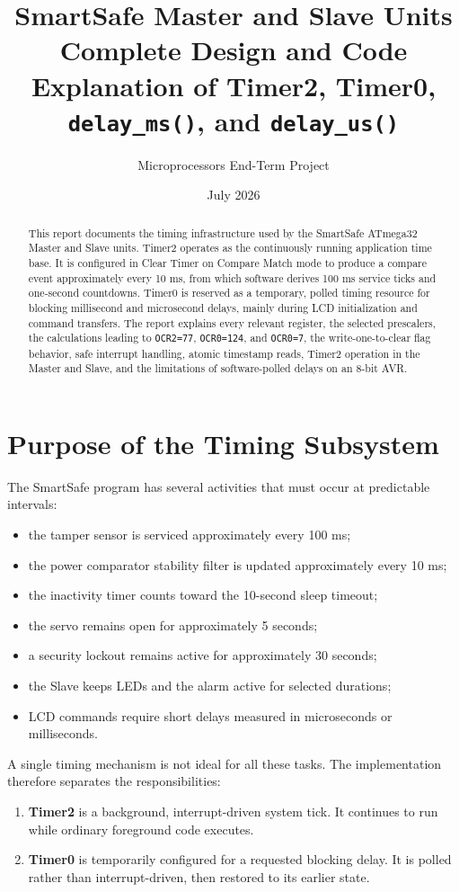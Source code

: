 \documentclass[11pt,a4paper]{article}
\title{\textbf{SmartSafe Master and Slave Units}\\[4pt]
\Large Complete Design and Code Explanation of Timer2, Timer0, \texttt{delay\_ms()}, and \texttt{delay\_us()}}
\author{Microprocessors End-Term Project}
\date{July 2026}
\begin{document}
\maketitle
\thispagestyle{empty}

\begin{abstract}
This report documents the timing infrastructure used by the SmartSafe ATmega32 Master and Slave units. Timer2 operates as the continuously running application time base. It is configured in Clear Timer on Compare Match mode to produce a compare event approximately every 10 ms, from which software derives 100 ms service ticks and one-second countdowns. Timer0 is reserved as a temporary, polled timing resource for blocking millisecond and microsecond delays, mainly during LCD initialization and command transfers. The report explains every relevant register, the selected prescalers, the calculations leading to \texttt{OCR2=77}, \texttt{OCR0=124}, and \texttt{OCR0=7}, the write-one-to-clear flag behavior, safe interrupt handling, atomic timestamp reads, Timer2 operation in the Master and Slave, and the limitations of software-polled delays on an 8-bit AVR.
\end{abstract}

\tableofcontents
\newpage

\section{Purpose of the Timing Subsystem}
The SmartSafe program has several activities that must occur at predictable intervals:
\begin{itemize}
  \item the tamper sensor is serviced approximately every 100 ms;
  \item the power comparator stability filter is updated approximately every 10 ms;
  \item the inactivity timer counts toward the 10-second sleep timeout;
  \item the servo remains open for approximately 5 seconds;
  \item a security lockout remains active for approximately 30 seconds;
  \item the Slave keeps LEDs and the alarm active for selected durations;
  \item LCD commands require short delays measured in microseconds or milliseconds.
\end{itemize}

A single timing mechanism is not ideal for all these tasks. The implementation therefore separates the responsibilities:
\begin{enumerate}
  \item \textbf{Timer2} is a background, interrupt-driven system tick. It continues to run while ordinary foreground code executes.
  \item \textbf{Timer0} is temporarily configured for a requested blocking delay. It is polled rather than interrupt-driven, then restored to its earlier state.
\end{enumerate}
\end{document}
